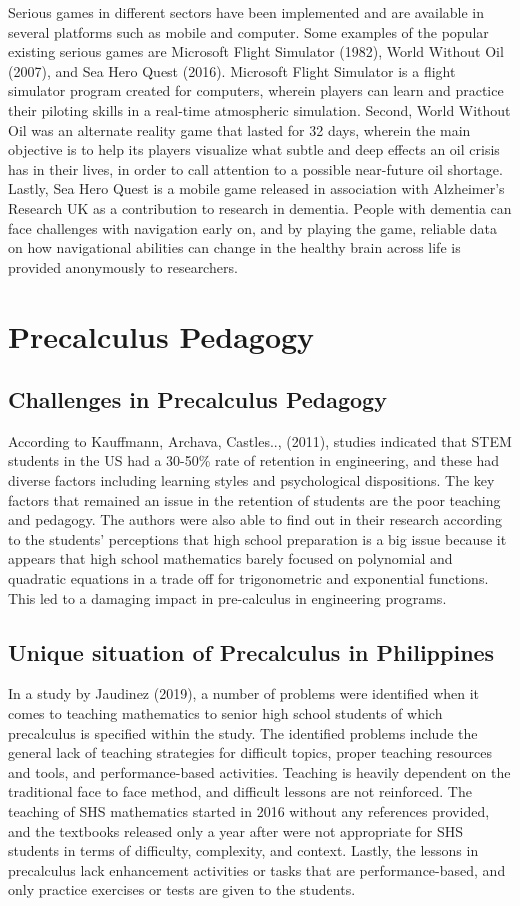 Serious games in different sectors have been implemented and are available in several platforms such as mobile and computer. Some examples of the popular existing serious games are Microsoft Flight Simulator (1982), World Without Oil (2007), and Sea Hero Quest (2016). Microsoft Flight Simulator is a flight simulator program created for computers, wherein players can learn and practice their piloting skills in a real-time atmospheric simulation. Second, World Without Oil was an alternate reality game that lasted for 32 days, wherein the main objective is to help its players visualize what subtle and deep effects an oil crisis has in their lives, in order to call attention to a possible near-future oil shortage. Lastly, Sea Hero Quest is a mobile game released in association with Alzheimer’s Research UK as a contribution to research in dementia. People with dementia can face challenges with navigation early on, and by playing the game, reliable data on how navigational abilities can change in the healthy brain across life is provided anonymously to researchers.

\section{Precalculus Pedagogy}
\subsection{Challenges in Precalculus Pedagogy}
According to Kauffmann, Archava, Castles.., (2011), studies indicated that STEM students in the US had a 30-50\% rate of retention in engineering, and these had diverse factors including learning styles and psychological dispositions. The key factors that remained an issue in the retention of students are the poor teaching and pedagogy. The authors were also able to find out in their research according to the students’ perceptions that high school preparation is a big issue because it appears that high school mathematics barely focused on polynomial and quadratic equations in a trade off for trigonometric and exponential functions. This led to a damaging impact in pre-calculus in engineering programs.
\subsection{Unique situation of Precalculus in Philippines}
In a study by Jaudinez (2019), a number of problems were identified when it comes to teaching mathematics to senior high school students of which precalculus is specified within the study. The identified problems include the general lack of teaching strategies for difficult topics, proper teaching resources and tools, and performance-based activities. Teaching is heavily dependent on the traditional face to face method, and difficult lessons are not reinforced. The teaching of SHS mathematics started in 2016 without any references provided, and the textbooks released only a year after were not appropriate for SHS students in terms of difficulty, complexity, and context. Lastly, the lessons in precalculus lack enhancement activities or tasks that are performance-based, and only practice exercises or tests are given to the students.
